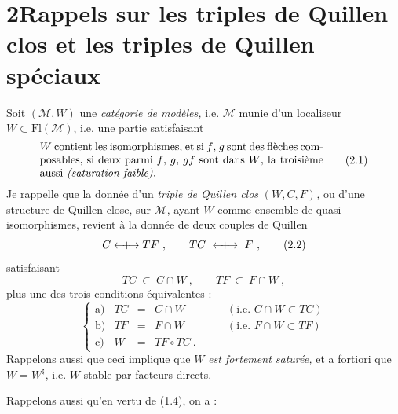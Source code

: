 \section*{2\quad Rappels sur les triples de Quillen clos et les triples de Quillen spéciaux}

Soit $(\mathcal{M}, W)$ une \textit{catégorie de modèles,} i.e. $\mathcal{M}$ munie d'un localiseur $W \subset \mathrm{Fl}(\mathcal{M})$, i.e. une partie satisfaisant
\[
\parbox{0.75\textwidth}{$W$ contient les isomorphismes, et si $f$, $g$ sont des flèches composables, si deux parmi $f$, $g$, $gf$ sont dans $W$, la troisième aussi \textit{(saturation faible).}}
\tag*{(2.1)}
\]
Je rappelle que la donnée d'un \textit{triple de Quillen clos} $(W, C, F)$\textit{,} ou d'une structure de Quillen close, sur $\mathcal{M}$, ayant $W$ comme ensemble de quasi-isomorphismes, revient à la donnée de deux couples de Quillen
\[
C \Qcouple TF\ , \qquad TC \ \Qcouple\ F\ , \tag*{(2.2)}
\]
satisfaisant
\[
TC \ \subset\ C \cap W\ , \qquad TF \ \subset\ F \cap W\ , \tag*{(2.3)}
\]
plus une des trois conditions équivalentes :
\[
\left\{
\begin{array}{lrcll}
\text{a)} & TC & = & C \cap W & \qquad (\text{i.e. } C \cap W \subset TC) \\[1ex]
\text{b)} & TF & = & F \cap W & \qquad (\text{i.e. } F \cap W \subset TF) \\[1ex]
\text{c)} & W & = & TF \circ TC\ . &
\end{array}
\right.
\tag*{(2.4)}
\]
Rappelons aussi que ceci implique que $W$ \textit{est fortement saturée,} et a fortiori que $W = W^{\natural}$, i.e. $W$ stable par facteurs directs.

Rappelons aussi qu'en vertu de (1.4), on a :



